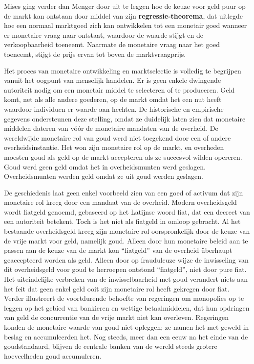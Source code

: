 Mises ging verder dan Menger door uit te leggen hoe de keuze voor geld puur op de markt kan ontstaan door middel van zijn \textbf{regressie-theorema}, dat uitlegde hoe een normaal marktgoed zich kan ontwikkelen tot een monetair goed wanneer er monetaire vraag naar ontstaat, waardoor de waarde stijgt en de verkoopbaarheid toeneemt. Naarmate de monetaire vraag naar het goed toeneemt, stijgt de prijs ervan tot boven de marktvraagprijs.

Het proces van monetaire ontwikkeling en marktselectie is volledig te begrijpen vanuit het oogpunt van menselijk handelen. Er is geen enkele dwingende autoriteit nodig om een monetair middel te selecteren of te produceren. Geld komt, net als alle andere goederen, op de markt omdat het een nut heeft waardoor individuen er waarde aan hechten. De historische en empirische gegevens ondersteunen deze stelling, omdat ze duidelijk laten zien dat monetaire middelen dateren van vóór de monetaire mandaten van de overheid. De wereldwijde monetaire rol van goud werd niet toegekend door een of andere overheidsinstantie. Het won zijn monetaire rol op de markt, en overheden moesten goud als geld op de markt accepteren als ze succesvol wilden opereren. Goud werd geen geld omdat het in overheidsmunten werd geslagen. Overheidsmunten werden geld omdat ze uit goud werden geslagen.

De geschiedenis laat geen enkel voorbeeld zien van een goed of activum dat zijn monetaire rol kreeg door een mandaat van de overheid. Modern overheidsgeld wordt fiatgeld genoemd, gebaseerd op het Latijnse woord fiat, dat een decreet van een autoriteit betekent. Toch is het niet als fiatgeld in omloop gebracht. Al het bestaande overheidsgeld kreeg zijn monetaire rol oorspronkelijk door de keuze van de vrije markt voor geld, namelijk goud. Alleen door hun monetaire beleid aan te passen aan de keuze van de markt kon ``fiatgeld'' van de overheid überhaupt geaccepteerd worden als geld. Alleen door op frauduleuze wijze de inwisseling van dit overheidsgeld voor goud te herroepen ontstond ``fiatgeld'', niet door pure fiat. Het uiteindelijke verbreken van de inwisselbaarheid met goud verandert niets aan het feit dat geen enkel geld ooit zijn monetaire rol heeft gekregen door fiat. Verder illustreert de voortdurende behoefte van regeringen om monopolies op te leggen op het gebied van bankieren en wettige betaalmiddelen, dat hun opdringen van geld de concurrentie van de vrije markt niet kan overleven. Regeringen konden de monetaire waarde van goud niet opleggen; ze namen het met geweld in beslag en accumuleerden het. Nog steeds, meer dan een eeuw na het einde van de goudstandaard, blijven de centrale banken van de wereld steeds grotere hoeveelheden goud accumuleren.

